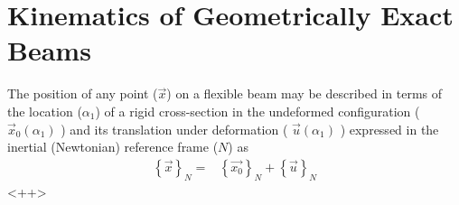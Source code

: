 \documentclass[a4paper]{article}
\begin{document}
\section*{Kinematics of Geometrically Exact Beams}

% 
The position of any point ($\vec{x}$) on a flexible beam may be described in terms of the location ($\alpha_{1}$) of a rigid cross-section in the undeformed configuration ( $\vec{x}_{0}\left( \alpha_{1} \right)$ ) and its translation under deformation ( $\vec{u}\left( \alpha_{1} \right)$ ) expressed in the inertial (Newtonian) reference frame ($N$) as 
\begin{align}
  \left\{\vec{x}\right\}_{N} =& \left\{\vec{x_{0}}\right\}_{N} + \left\{\vec{u}\right\}_{N}
  \label{<++>}
  \end{align}<++>
\end{document}
